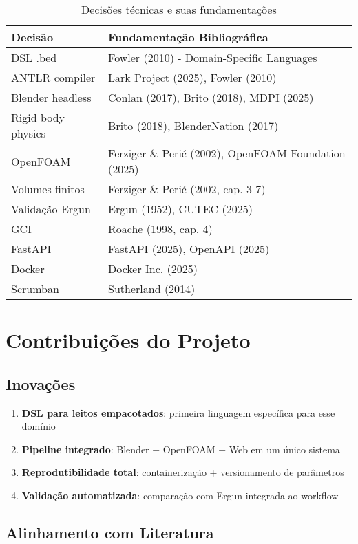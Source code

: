 \documentclass[12pt,a4paper]{article}
\begin{document}
\begin{table}[h]
\centering
\begin{tabular}{|l|l|}
\hline
\textbf{Decisão} & \textbf{Fundamentação Bibliográfica} \\
\hline
DSL .bed & Fowler (2010) - Domain-Specific Languages \\
ANTLR compiler & Lark Project (2025), Fowler (2010) \\
Blender headless & Conlan (2017), Brito (2018), MDPI (2025) \\
Rigid body physics & Brito (2018), BlenderNation (2017) \\
OpenFOAM & Ferziger \& Perić (2002), OpenFOAM Foundation (2025) \\
Volumes finitos & Ferziger \& Perić (2002, cap. 3-7) \\
Validação Ergun & Ergun (1952), CUTEC (2025) \\
GCI & Roache (1998, cap. 4) \\
FastAPI & FastAPI (2025), OpenAPI (2025) \\
Docker & Docker Inc. (2025) \\
Scrumban & Sutherland (2014) \\
\hline
\end{tabular}
\caption{Decisões técnicas e suas fundamentações}
\end{table}

\section{Contribuições do Projeto}

\subsection{Inovações}

\begin{enumerate}
    \item \textbf{DSL para leitos empacotados}: primeira linguagem específica para esse domínio
    \item \textbf{Pipeline integrado}: Blender + OpenFOAM + Web em um único sistema
    \item \textbf{Reprodutibilidade total}: containerização + versionamento de parâmetros
    \item \textbf{Validação automatizada}: comparação com Ergun integrada ao workflow
\end{enumerate}

\subsection{Alinhamento com Literatura}
\end{document}
